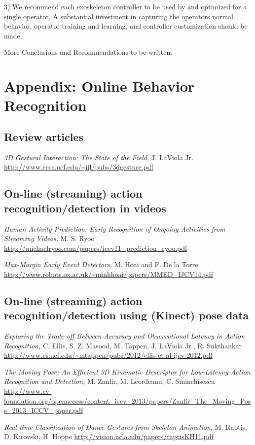 \documentclass[letterpaper,12pt,fullpage]{article}
\begin{document}
3) We recommend each exoskeleton controller
to be used by and optimized for a single operator.
A substantial investment in capturing the operators normal behavior,
operator training and learning, and controller customization should be made.

More Conclusions and Recommendations to be written.

\section{Appendix: Online Behavior Recognition}

\subsection{Review articles}

{\it 3D Gestural Interaction: The State of the Field,}
J. LaViola Jr.
\url{http://www.eecs.ucf.edu/~jjl/pubs/3dgesture.pdf}

\subsection{On-line (streaming) action recognition/detection in videos}

{\it Human Activity Prediction: Early Recognition of Ongoing Activities
from Streaming Videos,}
M. S. Ryoo
\url{http://michaelryoo.com/papers/iccv11_prediction_ryoo.pdf}

{\it Max-Margin Early Event Detectors,}
M. Hoai and F. De la Torre
\url{http://www.robots.ox.ac.uk/~minhhoai/papers/MMED_IJCV14.pdf}

\subsection{On-line (streaming) action recognition/detection using (Kinect) pose data}

{\it Exploring the Trade-off Between Accuracy and Observational Latency in
Action Recognition,}
C. Ellis, S. Z. Masood, M. Tappen, J. LaViola Jr., R. Sukthankar
\url{http://www.cs.ucf.edu/~mtappen/pubs/2012/ellis-et-al-ijcv-2012.pdf}

{\it The Moving Pose: An Efficient 3D Kinematic Descriptor for Low-Latency
Action Recognition and Detection,}
M. Zanfir, M. Leordeanu, C. Sminchisescu
\url{http://www.cv-foundation.org/openaccess/content_iccv_2013/papers/Zanfir_The_Moving_Pose_2013_ICCV_paper.pdf}

{\it Real-time Classification of Dance Gestures from Skeleton Animation,}
M. Raptis, D. Kirovski, H. Hoppe
\url{http://vision.ucla.edu/papers/raptisKH11.pdf}
\end{document}
